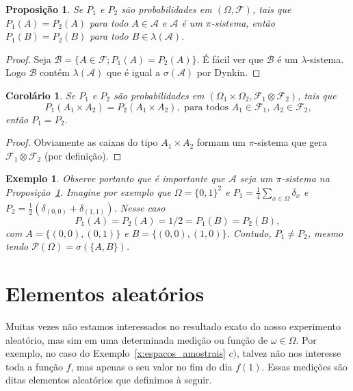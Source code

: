 \documentclass[reqno, final]{book}
\newcommand*\1{\mathds{1}}
\newtheorem{corollary}[theorem]{Corolário}
\newtheorem{proposition}[theorem]{Proposição}
\newtheorem{example}{Exemplo}[section]
\begin{document}
\begin{proposition}
  \label{p:P12_equal_pi}
  Se $P_1$ e $P_2$ são probabilidades em $(\Omega, \mathcal{F})$, tais que $P_1(A) = P_2(A)$ para todo $A \in \mathcal{A}$ e $\mathcal{A}$ é um $\pi$-sistema, então $P_1(B) = P_2(B)$ para todo $B \in \lambda(\mathcal{A})$.
\end{proposition}

\begin{proof}
  Seja $\mathcal{B} = \{A \in \mathcal{F}; P_1(A) = P_2(A)\}$.
  É fácil ver que $\mathcal{B}$ é um $\lambda$-sistema.
  Logo $\mathcal{B}$ contém $\lambda(\mathcal{A})$ que é igual a $\sigma(\mathcal{A})$ por Dynkin.
\end{proof}

\begin{corollary}
  \label{c:produto_e_unico}
  Se $P_1$ e $P_2$ são probabilidades em $(\Omega_1 \times \Omega_2, \mathcal{F}_1 \otimes \mathcal{F}_2)$, tais que
  \begin{equation}
    P_1(A_1 \times A_2) = P_2(A_1 \times A_2), \text{ para todos $A_1 \in \mathcal{F}_1$, $A_2 \in \mathcal{F}_2$,}
  \end{equation}
  então $P_1 = P_2$.
\end{corollary}

\begin{proof}
  Obviamente as caixas do tipo $A_1 \times A_2$ formam um $\pi$-sistema que gera $\mathcal{F}_1 \otimes \mathcal{F}_2$ (por definição).
\end{proof}

\begin{example}
  Observe portanto que é importante que $\mathcal{A}$ seja um $\pi$-sistema na Proposição~\ref{p:P12_equal_pi}.
  Imagine por exemplo que $\Omega = \{0,1\}^2$ e $P_1 = \tfrac 14 \sum_{x \in \Omega} \delta_x$ e $P_2 = \tfrac 12 (\delta_{(0,0)} + \delta_{(1,1)})$.
  Nesse caso
  \begin{equation}
    P_1(A) = P_2(A) = 1/2 = P_1(B) = P_2(B),
  \end{equation}
  com $A = \{(0,0), (0,1)\}$ e $B = \{(0,0), (1,0)\}$.
  Contudo, $P_1 \neq P_2$, mesmo tendo $\mathcal{P}(\Omega) = \sigma(\{A,B\})$.
\end{example}


\section{Elementos aleatórios}

Muitas vezes não estamos interessados no resultado exato do nosso experimento aleatório, mas sim em uma determinada medição ou função de $\omega \in \Omega$.
Por exemplo, no caso do Exemplo~\ref{x:espacos_amostrais} $c)$, talvez não nos interesse toda a função $f$, mas apenas o seu valor no fim do dia $f(1)$.
Essas medições são ditas elementos aleatórios que definimos à seguir.
\end{document}
